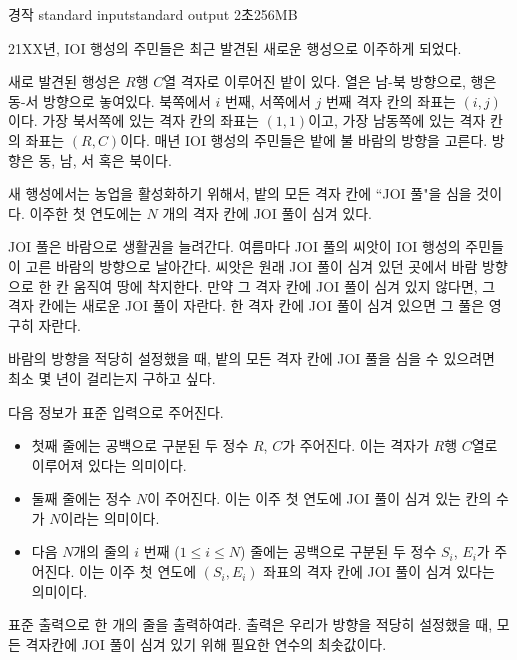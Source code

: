 \begin{problem}{경작}
	{standard input}{standard output}
	{2초}{256MB}{}
	
	21XX년, IOI 행성의 주민들은 최근 발견된 새로운 행성으로 이주하게 되었다.
	
	새로 발견된 행성은 $R$행 $C$열 격자로 이루어진 밭이 있다. 열은 남-북 방향으로, 행은 동-서 방향으로 놓여있다. 북쪽에서 $i$ 번째, 서쪽에서 $j$ 번째 격자 칸의 좌표는 $(i, j)$이다. 가장 북서쪽에 있는 격자 칸의 좌표는 $(1, 1)$이고, 가장 남동쪽에 있는 격자 칸의 좌표는 $(R, C)$이다. 매년 IOI 행성의 주민들은 밭에 불 바람의 방향을 고른다. 방향은 동, 남, 서 혹은 북이다.
	
	새 행성에서는 농업을 활성화하기 위해서, 밭의 모든 격자 칸에 ``JOI 풀"을 심을 것이다. 이주한 첫 연도에는 $N$ 개의 격자 칸에 JOI 풀이 심겨 있다.
	
	JOI 풀은 바람으로 생활권을 늘려간다. 여름마다 JOI 풀의 씨앗이 IOI 행성의 주민들이 고른 바람의 방향으로 날아간다. 씨앗은 원래 JOI 풀이 심겨 있던 곳에서 바람 방향으로 한 칸 움직여 땅에 착지한다. 만약 그 격자 칸에 JOI 풀이 심겨 있지 않다면, 그 격자 칸에는 새로운 JOI 풀이 자란다. 한 격자 칸에 JOI 풀이 심겨 있으면 그 풀은 영구히 자란다.
	
	바람의 방향을 적당히 설정했을 때, 밭의 모든 격자 칸에 JOI 풀을 심을 수 있으려면 최소 몇 년이 걸리는지 구하고 싶다.
	

	\InputFile
	
	다음 정보가 표준 입력으로 주어진다.
	
	\begin{itemize}
		\item 첫째 줄에는 공백으로 구분된 두 정수 $R$, $C$가 주어진다. 이는 격자가 $R$행 $C$열로 이루어져 있다는 의미이다.
		\item 둘째 줄에는 정수 $N$이 주어진다. 이는 이주 첫 연도에 JOI 풀이 심겨 있는 칸의 수가 $N$이라는 의미이다.
		\item 다음 $N$개의 줄의 $i$ 번째 ($1 \le i \le N$) 줄에는 공백으로 구분된 두 정수 $S_i$, $E_i$가 주어진다. 이는 이주 첫 연도에 $(S_i, E_i)$ 좌표의 격자 칸에 JOI 풀이 심겨 있다는 의미이다.
	\end{itemize}

	
	\OutputFile
	
	표준 출력으로 한 개의 줄을 출력하여라. 출력은 우리가 방향을 적당히 설정했을 때, 모든 격자칸에 JOI 풀이 심겨 있기 위해 필요한 연수의 최솟값이다.
	
	\Constraints
	
	\begin{itemize}
	

\end{itemize}
\end{problem}
